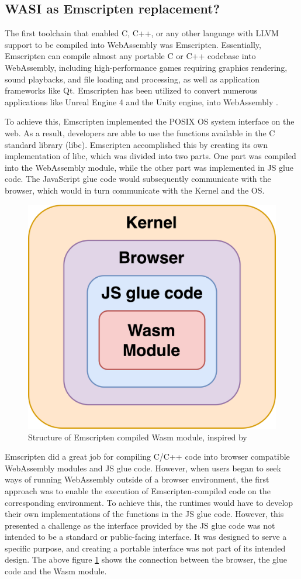 \subsection{WASI as Emscripten replacement?}
The first toolchain that enabled C, C++, or any other language with \gls{LLVM} support to be compiled into WebAssembly was Emscripten. Essentially, Emscripten can compile almost any portable C or C++ codebase into WebAssembly, including high-performance games requiring graphics rendering, sound playbacks, and file loading and processing, as well as application frameworks like Qt. Emscripten has been utilized to convert numerous applications like Unreal Engine 4 and the Unity engine, into WebAssembly \cite{emscriptencommunity_2023_emscripten}. 

To achieve this, Emscripten implemented the \gls{POSIX} OS system interface on the web. 
As a result, developers are able to use the functions available in the C standard library (\gls{libc}). 
Emscripten accomplished this by creating its own implementation of libc, which was divided into two parts. One part was compiled into the WebAssembly module, while the other part was implemented in \gls{JS glue code}. 
The JavaScript glue code would subsequently communicate with the browser, which would in turn communicate with the Kernel and the OS.

\begin{figure}[H]
    \centering
        \includegraphics[width=0.6\linewidth]{images/wasm/Emscripten.png}
    \caption{Structure of Emscripten compiled Wasm module, inspired by \cite{clark_2019_standardising}}
    \label{fig:emscripten}
\end{figure}

Emscripten did a great job for compiling C/C++ code into browser compatible WebAssembly modules and \gls{JS glue code}. However, when users began to seek ways of running WebAssembly outside of a browser environment, the first approach was to enable the execution of Emscripten-compiled code on the corresponding environment. To achieve this, the runtimes would have to develop their own implementations of the functions in the JS glue code. However, this presented a challenge as the interface provided by the \gls{JS glue code} was not intended to be a standard or public-facing interface. 
It was designed to serve a specific purpose, and creating a portable interface was not part of its intended design. The above figure \ref{fig:emscripten} shows the connection between the browser, the glue code and the Wasm module. 

